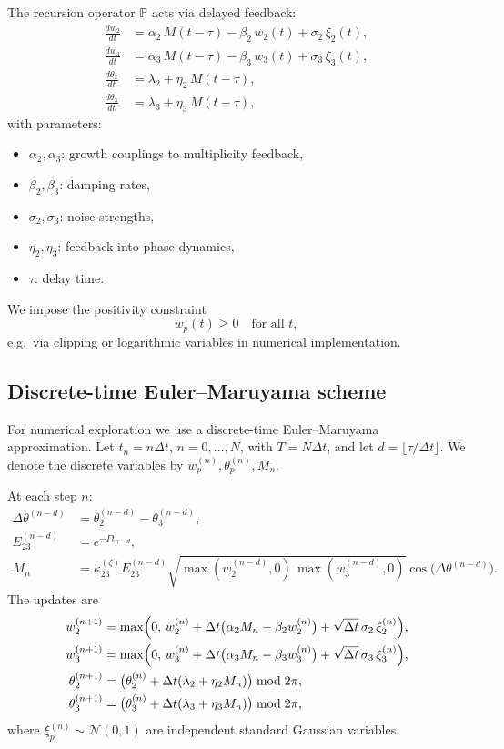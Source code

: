 \documentclass[11pt]{article}
\begin{document}
The recursion operator \(\mathbb{P}\) acts via delayed feedback:
\begin{align}
  \frac{dw_2}{dt}
  &= \alpha_2\, M(t-\tau) - \beta_2\, w_2(t) + \sigma_2\, \xi_2(t), \\
  \frac{dw_3}{dt}
  &= \alpha_3\, M(t-\tau) - \beta_3\, w_3(t) + \sigma_3\, \xi_3(t), \\
  \frac{d\theta_2}{dt}
  &= \lambda_2 + \eta_2\, M(t-\tau), \\
  \frac{d\theta_3}{dt}
  &= \lambda_3 + \eta_3\, M(t-\tau),
\end{align}
with parameters:
\begin{itemize}
  \item \(\alpha_2,\alpha_3\): growth couplings to multiplicity feedback,
  \item \(\beta_2,\beta_3\): damping rates,
  \item \(\sigma_2,\sigma_3\): noise strengths,
  \item \(\eta_2,\eta_3\): feedback into phase dynamics,
  \item \(\tau\): delay time.
\end{itemize}
We impose the positivity constraint
\begin{equation}
  w_p(t) \ge 0 \quad \text{for all } t,
\end{equation}
e.g.\ via clipping or logarithmic variables in numerical implementation.

\subsection{Discrete-time Euler--Maruyama scheme}

For numerical exploration we use a discrete-time Euler--Maruyama approximation.
Let \(t_n = n\Delta t\), \(n = 0,\dots,N\), with \(T = N\Delta t\), and let \(d = \lfloor \tau / \Delta t \rfloor\).
We denote the discrete variables by \(w_p^{(n)}, \theta_p^{(n)}, M_n\).

At each step \(n\):
\begin{align}
  \Delta\theta^{(n-d)} &= \theta_2^{(n-d)} - \theta_3^{(n-d)}, \\
  E_{23}^{(n-d)} &= e^{-\Gamma t_{n-d}}, \\
  M_{n}
  &= \kappa_{23}^{(\zeta)} E_{23}^{(n-d)}
    \sqrt{\max(w_2^{(n-d)},0)\,\max(w_3^{(n-d)},0)}
    \cos\bigl(\Delta\theta^{(n-d)}\bigr).
\end{align}
The updates are
\begin{align}
  w_2^{(n+1)}
  &= \max\Bigl(0,\,
     w_2^{(n)} + \Delta t \bigl(\alpha_2 M_{n} - \beta_2 w_2^{(n)}\bigr)
     + \sqrt{\Delta t}\,\sigma_2\, \xi_2^{(n)} \Bigr), \\
  w_3^{(n+1)}
  &= \max\Bigl(0,\,
     w_3^{(n)} + \Delta t \bigl(\alpha_3 M_{n} - \beta_3 w_3^{(n)}\bigr)
     + \sqrt{\Delta t}\,\sigma_3\, \xi_3^{(n)} \Bigr), \\
  \theta_2^{(n+1)}
  &= \bigl(\theta_2^{(n)} + \Delta t(\lambda_2 + \eta_2 M_{n})\bigr) \bmod 2\pi, \\
  \theta_3^{(n+1)}
  &= \bigl(\theta_3^{(n)} + \Delta t(\lambda_3 + \eta_3 M_{n})\bigr) \bmod 2\pi,
\end{align}
where \(\xi_p^{(n)} \sim \mathcal{N}(0,1)\) are independent standard Gaussian variables.
\end{document}
